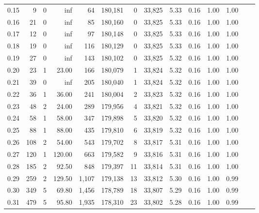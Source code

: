 \begin{tabular}{rrrrrrrrrrrrrr}
0.15 &       9 &      0 &     inf &       64 &  180,181 &       0 &  33,825 &  5.33 &  0.16 &  1.00 &      1.00 \\
0.16 &      21 &      0 &     inf &       85 &  180,160 &       0 &  33,825 &  5.33 &  0.16 &  1.00 &      1.00 \\
0.17 &      12 &      0 &     inf &       97 &  180,148 &       0 &  33,825 &  5.33 &  0.16 &  1.00 &      1.00 \\
0.18 &      19 &      0 &     inf &      116 &  180,129 &       0 &  33,825 &  5.33 &  0.16 &  1.00 &      1.00 \\
0.19 &      27 &      0 &     inf &      143 &  180,102 &       0 &  33,825 &  5.32 &  0.16 &  1.00 &      1.00 \\
0.20 &      23 &      1 &   23.00 &      166 &  180,079 &       1 &  33,824 &  5.32 &  0.16 &  1.00 &      1.00 \\
0.21 &      39 &      0 &     inf &      205 &  180,040 &       1 &  33,824 &  5.32 &  0.16 &  1.00 &      1.00 \\
0.22 &      36 &      1 &   36.00 &      241 &  180,004 &       2 &  33,823 &  5.32 &  0.16 &  1.00 &      1.00 \\
0.23 &      48 &      2 &   24.00 &      289 &  179,956 &       4 &  33,821 &  5.32 &  0.16 &  1.00 &      1.00 \\
0.24 &      58 &      1 &   58.00 &      347 &  179,898 &       5 &  33,820 &  5.32 &  0.16 &  1.00 &      1.00 \\
0.25 &      88 &      1 &   88.00 &      435 &  179,810 &       6 &  33,819 &  5.32 &  0.16 &  1.00 &      1.00 \\
0.26 &     108 &      2 &   54.00 &      543 &  179,702 &       8 &  33,817 &  5.31 &  0.16 &  1.00 &      1.00 \\
0.27 &     120 &      1 &  120.00 &      663 &  179,582 &       9 &  33,816 &  5.31 &  0.16 &  1.00 &      1.00 \\
0.28 &     185 &      2 &   92.50 &      848 &  179,397 &      11 &  33,814 &  5.31 &  0.16 &  1.00 &      1.00 \\
0.29 &     259 &      2 &  129.50 &    1,107 &  179,138 &      13 &  33,812 &  5.30 &  0.16 &  1.00 &      0.99 \\
0.30 &     349 &      5 &   69.80 &    1,456 &  178,789 &      18 &  33,807 &  5.29 &  0.16 &  1.00 &      0.99 \\
0.31 &     479 &      5 &   95.80 &    1,935 &  178,310 &      23 &  33,802 &  5.28 &  0.16 &  1.00 &      0.99 \\

\end{tabular}
